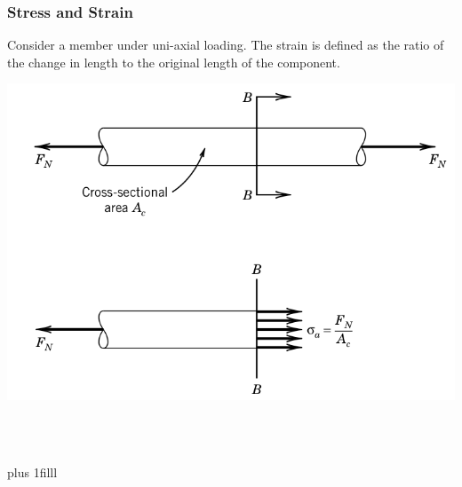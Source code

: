 \documentclass[fleqn]{beamer} %
\newcommand{\sectionIsubsectionIItitle}{Stress and Strain}
\newcommand{\btVFill}{\vskip0pt plus 1filll}
\begin{document}
			\begin{frame}
				\frametitle{\sectionIsubsectionIItitle}\small
				\bigskip

				Consider a member under uni-axial loading. The {\RD strain} is defined as the ratio of the change in length to the original length of the  component.  

				\begin{multicols}{2}
				\includegraphics[scale=.25]{images/strain_fig1.png}


				\hspace{15mm}\vspace{10mm}\\
				\hspace{15mm}\vspace{10mm} \\
				\hspace{15mm}\vspc
				\end{multicols}

				\btVFill
				
			\end{frame}
\end{document}
